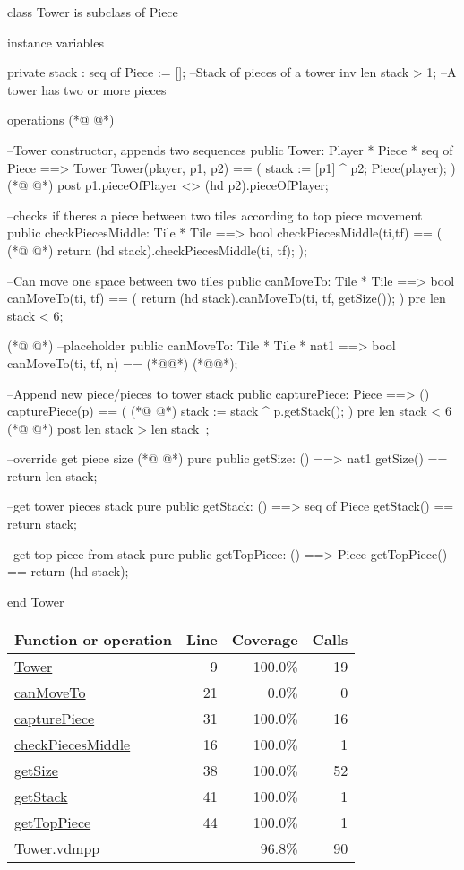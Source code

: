 \begin{vdmpp}[breaklines=true]
class Tower is subclass of Piece

instance variables

 private stack : seq of Piece := []; --Stack of pieces of a tower
 inv len stack > 1; --A tower has two or more pieces
 
operations
(*@
\label{Tower:9}
@*)

  --Tower constructor, appends two sequences
  public Tower: Player * Piece * seq of Piece ==> Tower
  Tower(player, p1, p2) == ( 
    stack := [p1] ^ p2;
    Piece(player);
  )
(*@
\label{checkPiecesMiddle:16}
@*)
  post p1.pieceOfPlayer <> (hd p2).pieceOfPlayer;
  
  --checks if theres a piece between two tiles according to top piece movement
  public checkPiecesMiddle: Tile * Tile ==> bool
  checkPiecesMiddle(ti,tf) == (
(*@
\label{canMoveTo:21}
@*)
    return (hd stack).checkPiecesMiddle(ti, tf);
  );
  
  --Can move one space between two tiles
  public canMoveTo: Tile * Tile ==> bool
  canMoveTo(ti, tf) == (
    return (hd stack).canMoveTo(ti, tf, getSize());
  )
  pre len stack < 6;
  
(*@
\label{capturePiece:31}
@*)
  --placeholder
  public canMoveTo: Tile * Tile * nat1 ==> bool
  canMoveTo(ti, tf, n) == (*@@*) (*@@*);
  
  --Append new piece/pieces to tower stack
  public capturePiece: Piece ==> ()
  capturePiece(p) == (
(*@
\label{getSize:38}
@*)
   stack := stack ^ p.getStack();
  )
  pre len stack < 6
(*@
\label{getStack:41}
@*)
  post len stack > len stack~;
  
  --override get piece size
(*@
\label{getTopPiece:44}
@*)
  pure public getSize: () ==> nat1
  getSize() == return len stack;
  
  --get tower pieces stack
  pure public getStack: () ==> seq of Piece
  getStack() == return stack;
  
  --get top piece from stack
  pure public getTopPiece: () ==> Piece
  getTopPiece() == return (hd stack);
  
end Tower
\end{vdmpp}
\bigskip
\begin{longtable}{|l|r|r|r|}
\hline
Function or operation & Line & Coverage & Calls \\
\hline
\hline
\hyperref[Tower:9]{Tower} & 9&100.0\% & 19 \\
\hline
\hyperref[canMoveTo:21]{canMoveTo} & 21&0.0\% & 0 \\
\hline
\hyperref[capturePiece:31]{capturePiece} & 31&100.0\% & 16 \\
\hline
\hyperref[checkPiecesMiddle:16]{checkPiecesMiddle} & 16&100.0\% & 1 \\
\hline
\hyperref[getSize:38]{getSize} & 38&100.0\% & 52 \\
\hline
\hyperref[getStack:41]{getStack} & 41&100.0\% & 1 \\
\hline
\hyperref[getTopPiece:44]{getTopPiece} & 44&100.0\% & 1 \\
\hline
\hline
Tower.vdmpp & & 96.8\% & 90 \\
\hline
\end{longtable}

